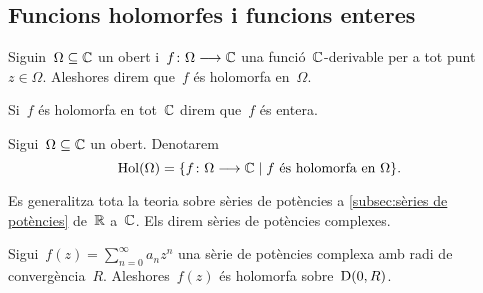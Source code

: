 \documentclass[../Apunts.tex]{subfiles}
\begin{document}
	\subsection{Funcions holomorfes i funcions enteres}
	\begin{definition}
		\label{def:funció holomorfa}
		Siguin~\(\Omega\subseteq\mathbb{C}\) un obert i~\(f\colon\Omega\longrightarrow\mathbb{C}\) una funció~\(\mathbb{C}\)-derivable per a tot punt~\(z\in\Omega\). Aleshores direm que~\(f\) és holomorfa en~\(\Omega\).
		
		Si~\(f\) és holomorfa en tot~\(\mathbb{C}\) direm que~\(f\) és entera.
	\end{definition}
	\begin{notation}
		Sigui~\(\Omega\subseteq\mathbb{C}\) un obert. Denotarem
		\[\operatorname{Hol}(\Omega)=\{f\colon\Omega\longrightarrow\mathbb{C}\mid f\text{ és holomorfa en }\Omega\}.\]
	\end{notation}
	\begin{note}
		Es generalitza tota la teoria sobre sèries de potències a \ref{subsec:sèries de potències} de~\(\mathbb{R}\) a~\(\mathbb{C}\). Els direm sèries de potències complexes.
	\end{note}
	\begin{example}
		Sigui~\(f(z)=\sum_{n=0}^{\infty}a_{n}z^{n}\) una sèrie de potències complexa amb radi de convergència~\(R\). Aleshores~\(f(z)\) és holomorfa sobre~\(\operatorname{D}(0,R)\).
	\end{example}
\end{document}
